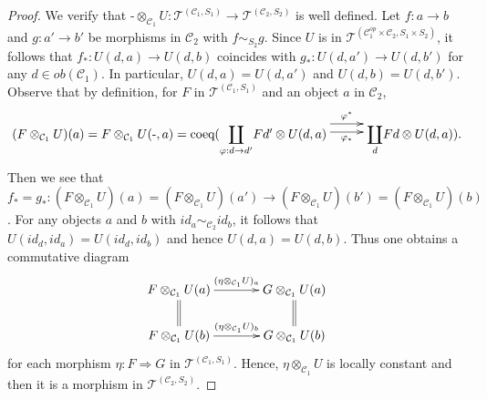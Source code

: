 \documentclass{amsart}
\theoremstyle{definition}
\theoremstyle{remark}
\newcommand{\C}{{\mathcal C}}
\newcommand{\T}{{\mathcal T}}
\begin{document}
\begin{proof}
We verify that $\text{-}\otimes_{\C_1}U :  \T^{(\C_1, S_1)} \to \T^{(\C_2, S_2)}$ is well defined. 
Let $f : a\to b$ and $g : a' \to b'$ be morphisms in $\C_2$ with $f\sim_{S_2} g$. Since $U$ is in $\T^{(\C_1^{op}\times \C_2, S_1 \times S_2)}$, it follows that $f_* : U(d, a) \to U(d, b)$ coincides with $g_* : U(d, a') \to U(d, b')$ for any $d \in ob(\C_1)$. 
In particular, $U(d, a) = U(d, a')$ and $U(d, b) = U(d, b')$. Observe that 
by definition, for $F$ in $\T^{(\C_1, S_1)}$ and an object $a$ in $\C_2$, 
$$
\xymatrix@C10pt@R20pt{
(F\otimes_{\C_1}U )(a) = F\otimes_{\C_1}U( \text{-}, a) = \text{coeq}({\displaystyle
\coprod_{\varphi : d \to d'}}Fd'\otimes U(d,a) \ar@<2.0ex>[rr]^-{\varphi^*}\ar@<0.5ex>[rr]_-{\varphi_*}& &
{\displaystyle\coprod_{d}}Fd \otimes U(d, a)
).
}
$$
Then we see that $f_* = g_*  : (F\otimes_{\C_1}U )(a) = (F\otimes_{\C_1}U )(a') \to (F\otimes_{\C_1}U )(b') = (F\otimes_{\C_1}U )(b)$.  
For any objects $a$ and $b$ with $id_a \sim_{\C_2} id_b$, it follows that $U(id_d, id_a) = U(id_d, id_b)$ 
and hence $U(d, a) = U(d, b)$. Thus one obtains a commutative diagram 
$$
\xymatrix@C35pt@R20pt{
F\otimes_{\C_1} U(a) \ar[r]^-{(\eta\otimes_{\C_1} U)_a}\ar@{=}[d]& G\otimes_{\C_1}U(a) \ar@{=}[d]\\
F\otimes_{\C_1} U(b) \ar[r]^-{(\eta\otimes_{\C_1} U)_b}& G\otimes_{\C_1}U(b) 
}
$$
for each morphism $\eta : F \Rightarrow G$ in $\T^{(\C_1, S_1)}$. Hence, $\eta\otimes_{\C_1} U$ is locally constant and then 
it is a morphism in $\T^{(\C_2, S_2)}$. 


\end{proof}
\end{document}
